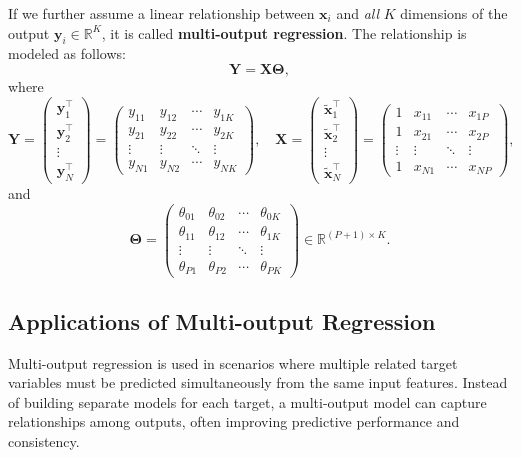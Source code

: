 \documentclass{article}
\begin{document}
If we further assume a linear relationship between $\mathbf{x}_i$ and \textit{all} $K$ dimensions of the output $\mathbf{y}_i \in \mathbb{R}^K$, it is called \textbf{multi-output regression}. The relationship is modeled as follows:
\[
\mathbf{Y} = \mathbf{X}\boldsymbol{\Theta},
\]
where
\[
\mathbf{Y} =
\begin{pmatrix}
\mathbf{y}_1^\top \\
\mathbf{y}_2^\top \\
\vdots \\
\mathbf{y}_N^\top
\end{pmatrix}
=
\begin{pmatrix}
y_{11} & y_{12} & \cdots & y_{1K} \\
y_{21} & y_{22} & \cdots & y_{2K} \\
\vdots & \vdots & \ddots & \vdots \\
y_{N1} & y_{N2} & \cdots & y_{NK}
\end{pmatrix},
\quad
\mathbf{X} =
\begin{pmatrix}
\tilde{\mathbf{x}}_1^\top \\
\tilde{\mathbf{x}}_2^\top \\
\vdots \\
\tilde{\mathbf{x}}_N^\top
\end{pmatrix}
=
\begin{pmatrix}
1 & x_{11} & \cdots & x_{1P} \\
1 & x_{21} & \cdots & x_{2P} \\
\vdots & \vdots & \ddots & \vdots \\
1 & x_{N1} & \cdots & x_{NP}
\end{pmatrix},
\]
and
\[
\boldsymbol{\Theta} =
\begin{pmatrix}
\theta_{01} & \theta_{02} & \cdots & \theta_{0K} \\
\theta_{11} & \theta_{12} & \cdots & \theta_{1K} \\
\vdots & \vdots & \ddots & \vdots \\
\theta_{P1} & \theta_{P2} & \cdots & \theta_{PK}
\end{pmatrix}
\in \mathbb{R}^{(P+1)\times K}.
\]

\subsection{Applications of Multi-output Regression}

Multi-output regression is used in scenarios where multiple related target variables must be predicted simultaneously from the same input features. Instead of building separate models for each target, a multi-output model can capture relationships among outputs, often improving predictive performance and consistency.
\end{document}
